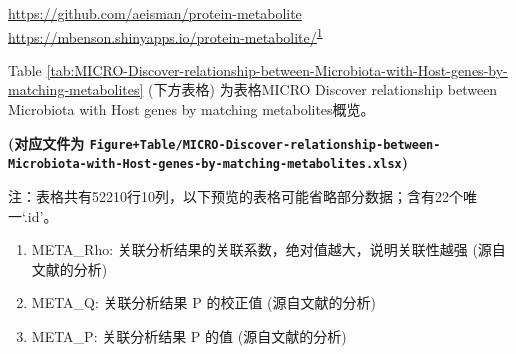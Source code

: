\documentclass[
]{article}
\providecommand{\tightlist}{%
  \setlength{\itemsep}{0pt}\setlength{\parskip}{0pt}}
\begin{document}
\url{https://github.com/aeisman/protein-metabolite}
\url{https://mbenson.shinyapps.io/protein-metabolite/}\textsuperscript{\protect\hyperlink{ref-ProteinMetabolBenson2023}{1}}

Table \ref{tab:MICRO-Discover-relationship-between-Microbiota-with-Host-genes-by-matching-metabolites} (下方表格) 为表格MICRO Discover relationship between Microbiota with Host genes by matching metabolites概览。

\textbf{(对应文件为 \texttt{Figure+Table/MICRO-Discover-relationship-between-Microbiota-with-Host-genes-by-matching-metabolites.xlsx})}

\begin{center}\begin{tcolorbox}[colback=gray!10, colframe=gray!50, width=0.9\linewidth, arc=1mm, boxrule=0.5pt]注：表格共有52210行10列，以下预览的表格可能省略部分数据；含有22个唯一`.id'。
\end{tcolorbox}
\end{center}
\begin{center}\begin{tcolorbox}[colback=gray!10, colframe=gray!50, width=0.9\linewidth, arc=1mm, boxrule=0.5pt]\begin{enumerate}\tightlist
\item META\_Rho:  关联分析结果的关联系数，绝对值越大，说明关联性越强 (源自文献的分析)
\item META\_Q:  关联分析结果 P 的校正值 (源自文献的分析)
\item META\_P:  关联分析结果 P 的值 (源自文献的分析)
\end{enumerate}\end{tcolorbox}
\end{center}
\end{document}
